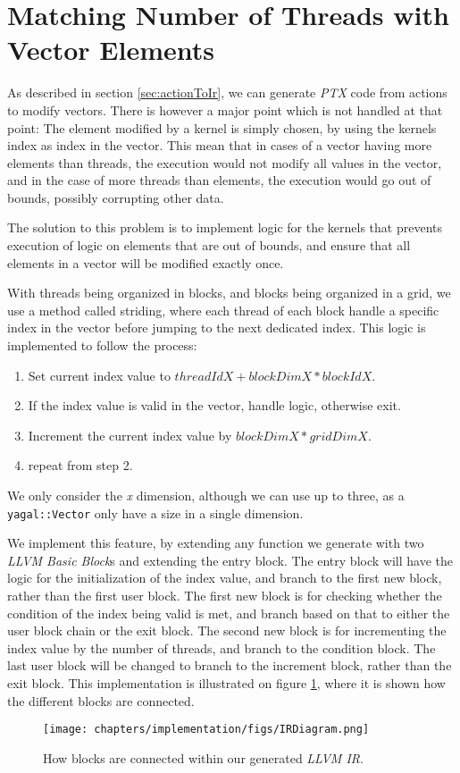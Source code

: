 \section{Matching Number of Threads with Vector Elements}
As described in section \ref{sec:actionToIr}, we can generate \textit{PTX} code from actions to modify vectors. There is however a major point which is not handled at that point: The element modified by a kernel is simply chosen, by using the kernels index as index in the vector. This mean that in cases of a vector having more elements than threads, the execution would not modify all values in the vector, and in the case of more threads than elements, the execution would go out of bounds, possibly corrupting other data.

The solution to this problem is to implement logic for the kernels that prevents execution of logic on elements that are out of bounds, and ensure that all elements in a vector will be modified exactly once.

With threads being organized in blocks, and blocks being organized in a grid, we use a method called striding, where each thread of each block handle a specific index in the vector before jumping to the next dedicated index. This logic is implemented to follow the process:

\begin{enumerate}
\item Set current index value to $threadIdX + blockDimX * blockIdX$.
\item If the index value is valid in the vector, handle logic, otherwise exit.
\item Increment the current index value by $blockDimX * gridDimX$.
\item repeat from step 2.
\end{enumerate}

We only consider the \textit{x} dimension, although we can use up to three, as a \texttt{yagal::Vector} only have a size in a single dimension.

We implement this feature, by extending any function we generate with two \textit{LLVM Basic Block}s and extending the entry block. The entry block will have the logic for the initialization of the index value, and branch to the first new block, rather than the first user block. The first new block is for checking whether the condition of the index being valid is met, and branch based on that to either the user block chain or the exit block. The second new block is for incrementing the index value by the number of threads, and branch to the condition block. The last user block will be changed to branch to the increment block, rather than the exit block. This implementation is illustrated on figure \ref{blockFlowLoop}, where it is shown how the different blocks are connected.

\begin{figure}[!htb]
    \centering
    \texttt{[image: chapters/implementation/figs/IRDiagram.png]}
    \caption{How blocks are connected within our generated \textit{LLVM IR}.}
    \label{blockFlowLoop}
\end{figure}